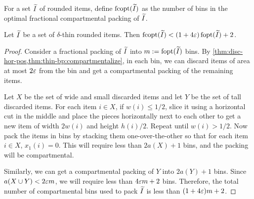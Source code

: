 For a set $\widetilde{I}$ of rounded items, define $\operatorname{fcopt}(\widetilde{I})$ as the number of bins in
the optimal fractional compartmental packing of $\widetilde{I}$.

\begin{theorem}
\label{thm:struct}
Let $\widetilde{I}$ be a set of $\delta$-thin rounded items. Then
$\operatorname{fcopt}(\widetilde{I}) < (1+4\varepsilon)\operatorname{fopt}(\widetilde{I}) + 2$.
\end{theorem}
\begin{proof}
Consider a fractional packing of $\widetilde{I}$ into $m := \operatorname{fopt}(\widetilde{I})$ bins.
By \cref{thm:disc-hor-pos,thm:thin-bp:compartmentalize}, in each bin,
we can discard items of area at most $2\varepsilon$ from the bin
and get a compartmental packing of the remaining items.

Let $X$ be the set of wide and small discarded items
and let $Y$ be the set of tall discarded items.
For each item $i \in X$, if $w(i) \le 1/2$, slice it using a horizontal cut in the middle
and place the pieces horizontally next to each other to get a new item
of width $2w(i)$ and height $h(i)/2$. Repeat until $w(i) > 1/2$.
Now pack the items in bins by stacking them one-over-the-other
so that for each item $i \in X$, $x_1(i) = 0$.
This will require less than $2a(X) + 1$ bins,
and the packing will be compartmental.

Similarly, we can get a compartmental packing of $Y$ into $2a(Y) + 1$ bins.
Since $a(X \cup Y) < 2\varepsilon m$, we will require less than $4\varepsilon m + 2$ bins.
Therefore, the total number of compartmental bins used to pack $\widetilde{I}$
is less than $(1 + 4\varepsilon)m + 2$.
\end{proof}
